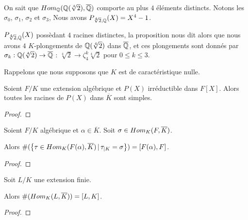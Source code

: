 \begin{exemple}
	On sait que
	$Hom_{\mathbb{Q}}(\mathbb{Q}(\sqrt[4]{2}), \overline{\mathbb{Q}})$
	comporte au plus $4$ éléments distincts. Notons les $\sigma_{0}$, $\sigma_{1}$,
	$\sigma_{2}$ et $\sigma_{3}$,
	Nous avons $P_{\sqrt[4]{2}, \mathbb{Q}}(X) = X^{4} - 1$.

	$P_{\sqrt[4]{2}, \mathbb{Q}}(X)$ possèdant $4$ racines distinctes, la
	proposition nous dit alors que nous avons $4$
	$K$-plongements de $\mathbb{Q}(\sqrt[4]{2})$ dans $\overline{\mathbb{Q}}$, et
	ces plongements sont donnés par
	$\sigma_{k} : \mathbb{Q}(\sqrt[4]{2}) \rightarrow \overline{\mathbb{Q}}$ :
	$\sqrt[4]{2} \rightarrow \zeta^{k}_{4} \sqrt[4]{2}$ pour $0 \leq k \leq 3$.
\end{exemple}

\begin{proposition}
	Rappelons que nous supposons que $K$ est de caractéristique nulle.

	Soient $F/K$ une extension algébrique et $P(X)$ irréductible dans $F[X]$.
	Alors toutes les racines de $P(X)$ dans $\overline{K}$ sont simples.
\end{proposition}

\ifdefined\outputproof
\begin{proof}

\end{proof}
\fi

\begin{corollary}
	Soient $F/K$ algébrique et $\alpha \in \overline{K}$.
	Soit $\sigma \in Hom_{K}(F, \overline{K})$.

	Alors $\#(\left\{\tau \in Hom_{K}(F(\alpha), \overline{K}) \, | \, \tau_{|K} =
\sigma \right\}) = [F(\alpha), F]$.
\end{corollary}

\ifdefined\outputproof
\begin{proof}

\end{proof}
\fi

\begin{proposition}
	Soit $L/K$ une extension finie.

	Alors $\#(Hom_{K}(L, \overline{K})) = [L, K]$.
\end{proposition}

\ifdefined\outputproof
\begin{proof}

\end{proof}
\fi

